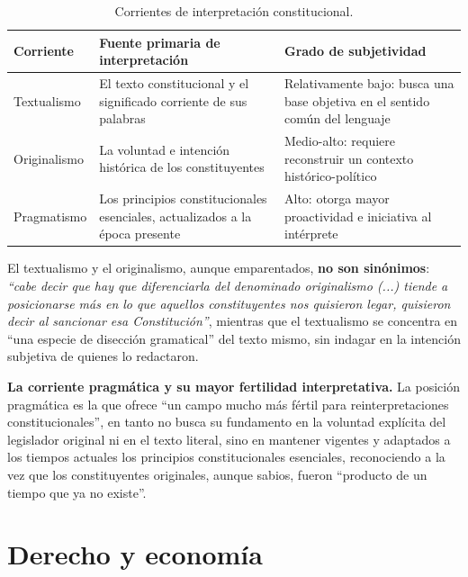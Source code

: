 \documentclass[12pt,oneside]{book}
\begin{document}
\begin{table}[H]
\centering
\small
\renewcommand{\arraystretch}{1.25}
\begin{tabularx}{\textwidth}{
    >{\raggedright\arraybackslash}p{}
    >{\raggedright\arraybackslash}X
    >{\raggedright\arraybackslash}X
}
\toprule
\textbf{Corriente} & \textbf{Fuente primaria de interpretación} & \textbf{Grado de subjetividad} \\
\midrule
Textualismo &
El texto constitucional y el significado corriente de sus palabras &
Relativamente bajo: busca una base objetiva en el sentido común del lenguaje \\

Originalismo &
La voluntad e intención histórica de los constituyentes &
Medio-alto: requiere reconstruir un contexto histórico-político \\

Pragmatismo &
Los principios constitucionales esenciales, actualizados a la época presente &
Alto: otorga mayor proactividad e iniciativa al intérprete \\
\bottomrule
\end{tabularx}
\caption{Corrientes de interpretación constitucional.}
\end{table}

El textualismo y el originalismo, aunque emparentados, \textbf{no son sinónimos}: \textit{``cabe decir que hay que diferenciarla del denominado originalismo (...) tiende a posicionarse más en lo que aquellos constituyentes nos quisieron legar, quisieron decir al sancionar esa Constitución''}, mientras que el textualismo se concentra en ``una especie de disección gramatical'' del texto mismo, sin indagar en la intención subjetiva de quienes lo redactaron.

\begin{important}
\textbf{La corriente pragmática y su mayor fertilidad interpretativa.} La posición pragmática es la que ofrece ``un campo mucho más fértil para reinterpretaciones constitucionales'', en tanto no busca su fundamento en la voluntad explícita del legislador original ni en el texto literal, sino en mantener vigentes y adaptados a los tiempos actuales los principios constitucionales esenciales, reconociendo a la vez que los constituyentes originales, aunque sabios, fueron ``producto de un tiempo que ya no existe''.
\end{important}

\section{Derecho y economía}
\end{document}
